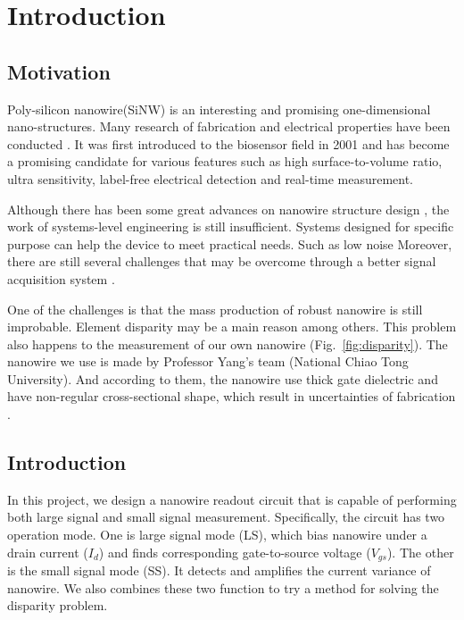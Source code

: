 \chapter{Introduction}
\section{Motivation}
Poly-silicon nanowire(SiNW) is an interesting and promising one-dimensional nano-structures.
Many research of fabrication and electrical properties have been conducted \cite{J1}.
It was first introduced to the biosensor field in 2001\cite{J2} and has become a promising candidate for various features such as high surface-to-volume ratio, ultra sensitivity, label-free electrical detection and  real-time measurement.

Although there has been some great advances on nanowire structure design \cite{J3}, the work of systems-level engineering is still insufficient.
Systems designed for specific purpose can help the device to meet practical needs.
{\color{red}Such as low noise }
Moreover, there are still several challenges that may be overcome through a better signal acquisition system \cite{R1}.

One of the challenges is that the mass production of robust nanowire is still improbable.
Element disparity may be a main reason among others.
This problem also happens to the measurement of our own nanowire (Fig.~\ref{fig:disparity}).
The nanowire we use is made by Professor Yang's team (National Chiao Tong University).
And according to them, the nanowire use thick gate dielectric and have non-regular cross-sectional shape, which result in uncertainties of fabrication \cite{C6}.


\section{Introduction}
In this project, we design a nanowire readout circuit that is capable of performing both large signal and small signal measurement.
Specifically, the circuit has two operation mode.
One is large signal mode (LS), which bias nanowire under a drain current ($I_d$) and finds corresponding gate-to-source voltage ($V_{gs}$).
The other is the small signal mode (SS).
It detects and amplifies the current variance of nanowire.
We also combines these two function to try a method for solving the disparity problem.

